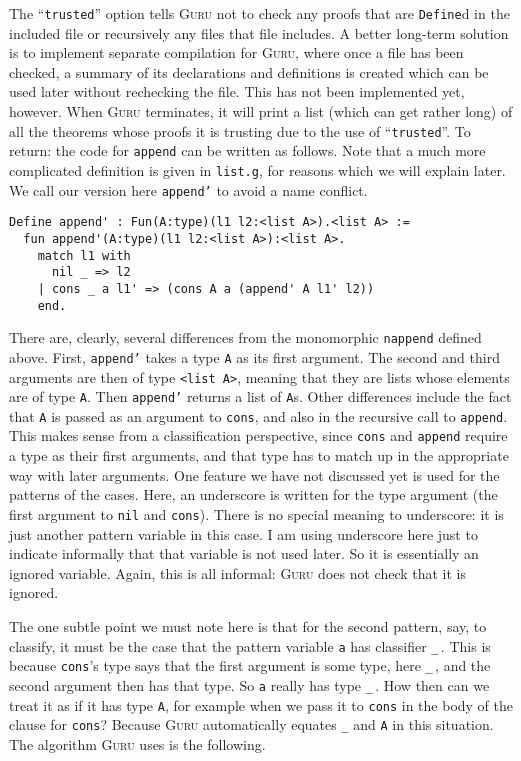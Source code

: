 \documentclass{book}[12pt]
\newcommand{\guru}[0]{\textsc{Guru}\xspace}
\begin{document}
\noindent The ``\texttt{trusted}'' option tells \guru not to check any
proofs that are \texttt{Define}d in the included file or recursively
any files that file includes.  A better long-term solution is to
implement separate compilation for \guru, where once a file has been
checked, a summary of its declarations and definitions is created
which can be used later without rechecking the file.  This has not
been implemented yet, however.  When \guru terminates, it will print a
list (which can get rather long) of all the theorems whose proofs it
is trusting due to the use of ``\texttt{trusted}''.  To return: the
code for \texttt{append} can be written as follows.  Note that a much
more complicated definition is given in \texttt{list.g}, for reasons
which we will explain later.  We call our version here
\texttt{append'} to avoid a name conflict.

\begin{verbatim}
Define append' : Fun(A:type)(l1 l2:<list A>).<list A> :=
  fun append'(A:type)(l1 l2:<list A>):<list A>.
    match l1 with
      nil _ => l2
    | cons _ a l1' => (cons A a (append' A l1' l2))
    end.
\end{verbatim}

\noindent There are, clearly, several differences from the monomorphic
\texttt{nappend} defined above.  First, \texttt{append'} takes a type
\texttt{A} as its first argument.  The second and third arguments are
then of type \texttt{<list A>}, meaning that they are lists whose
elements are of type \texttt{A}.  Then \texttt{append'} returns a list
of \texttt{A}s.  Other differences include the fact that \texttt{A} is
passed as an argument to \texttt{cons}, and also in the recursive call
to \texttt{append}.  This makes sense from a classification
perspective, since \texttt{cons} and \texttt{append} require a type as
their first arguments, and that type has to match up in the
appropriate way with later arguments.  One feature we have not
discussed yet is used for the patterns of the cases.  Here, an
underscore is written for the type argument (the first argument to
\texttt{nil} and \texttt{cons}).  There is no special meaning to
underscore: it is just another pattern variable in this case.  I am
using underscore here just to indicate informally that that variable
is not used later.  So it is essentially an ignored variable.  Again,
this is all informal: \guru does not check that it is ignored.  

The one subtle point we must note here is that for the second pattern,
say, to classify, it must be the case that the pattern variable
\texttt{a} has classifier \texttt{\_}\,.  This is because
\texttt{cons}'s type says that the first argument is some type, here
\texttt{\_}\,, and the second argument then has that type.  So
\texttt{a} really has type \texttt{\_}\,.  How then can we treat it as
if it has type \texttt{A}, for example when we pass it to
\texttt{cons} in the body of the clause for \texttt{cons}?  Because
\guru automatically equates \texttt{\_} and \texttt{A} in this
situation.  The algorithm \guru uses is the following.  
\end{document}
